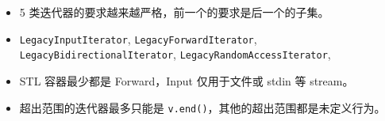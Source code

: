 
\begin{itemize}
\item 5 类迭代器的要求越来越严格，前一个的要求是后一个的子集。
\item \verb`LegacyInputIterator`, \verb`LegacyForwardIterator`, \verb`LegacyBidirectionalIterator`, \verb`LegacyRandomAccessIterator`, \verb``
\item STL 容器最少都是 Forward，Input 仅用于文件或 stdin 等 stream。
\item 超出范围的迭代器最多只能是 \verb`v.end()`，其他的超出范围都是未定义行为。
\end{itemize}


